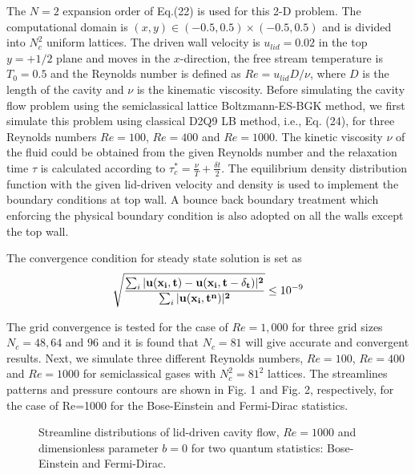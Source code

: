 \documentclass[doublecol]{epl2}
\begin{document}
The $N=2$ expansion order of Eq.(22) is used for this 2-D problem. The computational domain is $(x,y) \in  (-0.5,0.5)\times(-0.5,0.5)$ and is divided into $N_c^2$ uniform lattices.   The driven wall velocity is $u_{lid}=0.02$ in the top $y=+1/2$ plane and moves in the $x$-direction, the free stream temperature is $T_{0}=0.5$ and the Reynolds number is defined as $Re =u_{lid} D/\nu$, where $D$ is the length of the cavity and $\nu$ is the kinematic viscosity.   Before simulating the cavity flow problem using the semiclassical lattice Boltzmann-ES-BGK method, we first simulate this problem using classical D2Q9 LB method, i.e., Eq. (24), for three Reynolds numbers $Re=100$, $Re=400$ and $Re=1000$.   The kinetic viscosity $\nu$ of the fluid could be obtained from the given Reynolds number and the relaxation time $\tau$ is calculated according to $\tau_c^* =\frac{\nu}{T}+\frac{\delta t}{2}$.  The equilibrium density distribution function with the given lid-driven velocity and density is used to implement the boundary conditions at top wall. A  bounce back boundary treatment which enforcing the physical boundary condition is also adopted on all the walls except the top wall.

The convergence condition for steady state solution is set as
\begin{equation}
 \sqrt{ \frac{ \sum_i |\bf{u} (\bf{x}_i,t)-\bf{u} (\bf{x}_i,t-\delta_t)|^2}{\sum_i |\bf{u} (\bf{x}_i, t^n)|^2 } } \leq 10^{-9}
\end{equation}

The grid convergence is tested for the case of $Re=1,000$ for three grid sizes $N_c=48, 64$ and $96$ and it is found that $N_c=81$ will give accurate and convergent results.  Next, we simulate three different Reynolds numbers, $Re=100$, $Re=400$ and $Re=1000$ for semiclassical gases with $N_c^2=81^2$ lattices.
The streamlines patterns and pressure contours are shown in Fig. 1 and Fig. 2, respectively, for the case of Re=1000 for the Bose-Einstein and Fermi-Dirac statistics.

\begin{figure}[ht]
	\centering
	\vfill
	\caption[A set of four subfigures.]{Streamline distributions of lid-driven cavity flow, $Re=1000$ and dimensionless parameter $b=0$ for two  quantum statistics:
	 Bose-Einstein and
	 Fermi-Dirac.}
	\label{fig:Streamlines_b0}
\end{figure}
\end{document}
